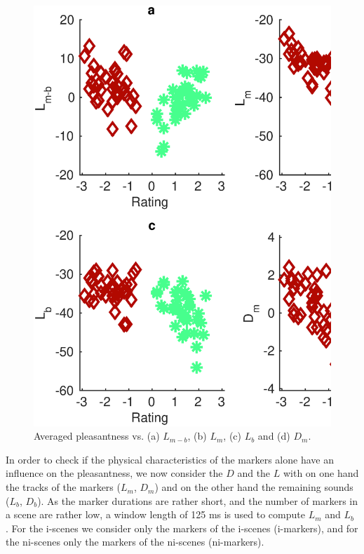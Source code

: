 \documentclass[twoside,twocolumn]{article}
\begin{document}
\begin{figure}[t]
\begin{center}
\includegraphics[width=.4\paperwidth]{../gfxMatlab/xp1_deSoLvMar_1.eps}
  \caption{\label{fig:numMarkers} Averaged pleasantness vs. (a)  $L_{m-b}$, (b) $L_{m}$, (c) $L_{b}$ and (d) $D_m$.}
  \end{center}
\end{figure}

In order to check if the physical characteristics of the markers alone have an influence on the pleasantness, we now consider the $D$ and the $L$ with on one hand the tracks of the markers ($L_m$, $D_{m}$) and on the other hand the remaining sounds ($L_b$, $D_b$). As the marker durations are rather short, and the number of markers in a scene are rather low, a window length of 125 ms is used to compute $L_m$ and $L_b$  . For the i-scenes we consider only the markers of the i-scenes (i-markers), and for the ni-scenes only the markers of the ni-scenes (ni-markers).  
\end{document}

